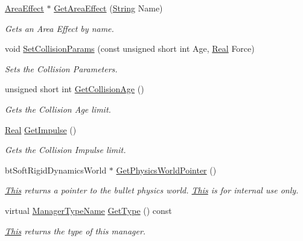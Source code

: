\begin{DoxyCompactItemize}
\hyperlink{classphys_1_1AreaEffect}{AreaEffect} $\ast$ \hyperlink{classphys_1_1PhysicsManager_a36b575504b1de592ee24d08ebf1fd620}{GetAreaEffect} (\hyperlink{namespacephys_aa03900411993de7fbfec4789bc1d392e}{String} Name)
\begin{DoxyCompactList}\small\item\em Gets an Area Effect by name. \item\end{DoxyCompactList}\item 
void \hyperlink{classphys_1_1PhysicsManager_a98ee9704eec230ff759850ffa8394489}{SetCollisionParams} (const unsigned short int Age, \hyperlink{namespacephys_af7eb897198d265b8e868f45240230d5f}{Real} Force)
\begin{DoxyCompactList}\small\item\em Sets the Collision Parameters. \item\end{DoxyCompactList}\item 
unsigned short int \hyperlink{classphys_1_1PhysicsManager_a4232e8cd52e70b623ef30c40be6cdb4a}{GetCollisionAge} ()
\begin{DoxyCompactList}\small\item\em Gets the Collision Age limit. \item\end{DoxyCompactList}\item 
\hyperlink{namespacephys_af7eb897198d265b8e868f45240230d5f}{Real} \hyperlink{classphys_1_1PhysicsManager_ad11ee3904e1725f95ce9bd58f4ee3925}{GetImpulse} ()
\begin{DoxyCompactList}\small\item\em Gets the Collision Impulse limit. \item\end{DoxyCompactList}\item 
btSoftRigidDynamicsWorld $\ast$ \hyperlink{classphys_1_1PhysicsManager_a4b4f8a23259a94a50c81649f39256d7f}{GetPhysicsWorldPointer} ()
\begin{DoxyCompactList}\small\item\em \hyperlink{structThis}{This} returns a pointer to the bullet physics world. \hyperlink{structThis}{This} is for internal use only. \item\end{DoxyCompactList}\item 
virtual \hyperlink{classphys_1_1ManagerBase_aaa6ccddf23892eaccb898529414f80a5}{ManagerTypeName} \hyperlink{classphys_1_1PhysicsManager_a4d151cd24052ef3cccde6b66b8745be6}{GetType} () const 
\begin{DoxyCompactList}\small\item\em \hyperlink{structThis}{This} returns the type of this manager. \item\end{DoxyCompactList}\end{DoxyCompactItemize}


